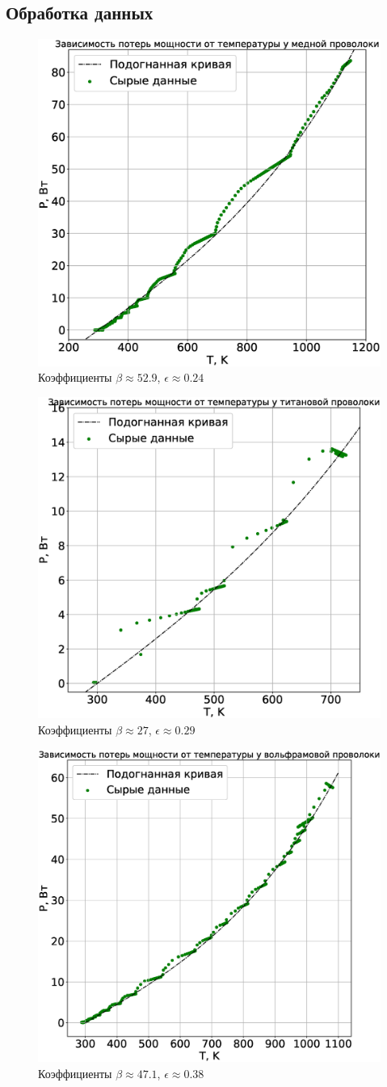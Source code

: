 \documentclass[a4paper,14pt]{extarticle}
\begin{document}
		\subsection{Обработка данных}
			\begin{figure}[h!]
				\centering
				\includegraphics[width=.55\linewidth]{Lab3_6.eps}
				\caption{Коэффициенты $\beta \approx 52.9$, $\epsilon \approx 0.24$}
				\label{fig6}
			\end{figure}
			\begin{figure}[h!]
				\centering
				\includegraphics[width=.60\linewidth]{Lab3_7.eps}
				\caption{Коэффициенты $\beta \approx 27$, $\epsilon \approx 0.29$}
				\label{fig}
			\end{figure}
			\begin{figure}[h!]
				\centering
				\includegraphics[width=.60\linewidth]{Lab3_8.eps}
				\caption{Коэффициенты $\beta \approx 47.1$, $\epsilon \approx 0.38$}
				\label{fig8}
			\end{figure}
\end{document}

